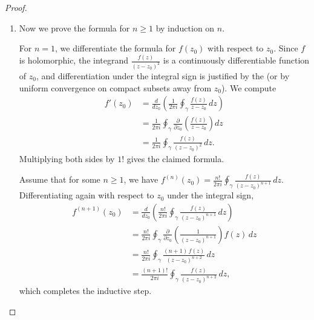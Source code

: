 \begin{proof}
\begin{enumerate}
        \item Now we prove the formula for $n \geq 1$ by induction on $n$.

        For $n = 1$, we differentiate the formula for $f(z_0)$ with respect to $z_0$. Since $f$ is holomorphic, the integrand $\frac{f(z)}{(z - z_0)^2}$ is a continuously differentiable function of $z_0$, and differentiation under the integral sign is justified by the  (or by uniform convergence on compact subsets away from $z_0$). We compute
        \begin{align*}
            f'(z_0) &= \frac{d}{dz_0} \left( \frac{1}{2\pi i} \oint_{\gamma} \frac{f(z)}{z - z_0}\,dz \right) \\
            &= \frac{1}{2\pi i} \oint_{\gamma} \frac{\partial}{\partial z_0} \left( \frac{f(z)}{z - z_0} \right) dz \\
            &= \frac{1}{2\pi i} \oint_{\gamma} \frac{f(z)}{(z - z_0)^2}\,dz.
        \end{align*}
        Multiplying both sides by $1!$ gives the claimed formula.

        Assume that for some $n \geq 1$, we have $f^{(n)}(z_0) = \frac{n!}{2\pi i} \oint_{\gamma} \frac{f(z)}{(z - z_0)^{n+1}}\,dz$. Differentiating again with respect to $z_0$ under the integral sign,
        \begin{align*}
            f^{(n+1)}(z_0) &= \frac{d}{dz_0} \left( \frac{n!}{2\pi i} \oint_{\gamma} \frac{f(z)}{(z - z_0)^{n+1}}\,dz \right) \\
            &= \frac{n!}{2\pi i} \oint_{\gamma} \frac{\partial}{\partial z_0} \left( \frac{1}{(z - z_0)^{n+1}} \right) f(z)\,dz \\
            &= \frac{n!}{2\pi i} \oint_{\gamma} \frac{(n+1)\,f(z)}{(z - z_0)^{n+2}}\,dz \\
            &= \frac{(n+1)!}{2\pi i} \oint_{\gamma} \frac{f(z)}{(z - z_0)^{n+2}}\,dz,
        \end{align*}
        which completes the inductive step.
    \end{enumerate}
\end{proof}